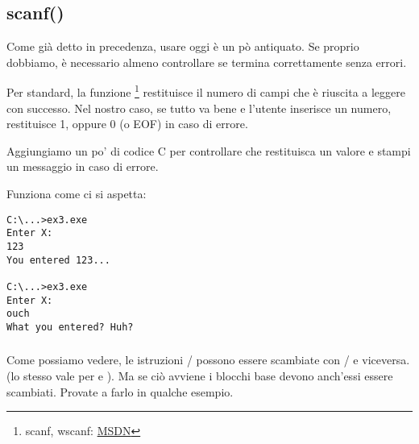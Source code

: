 \subsection{scanf()}

Come già detto in precedenza, usare \scanf oggi è un pò antiquato.
Se proprio dobbiamo, è necessario almeno controllare se \scanf termina correttamente senza errori.



Per standard, la funzione \scanf\footnote{scanf, wscanf: \href{http://msdn.microsoft.com/en-us/library/9y6s16x1(VS.71).aspx}{MSDN}} restituisce il numero di campi che è riuscita a leggere con successo.
Nel nostro caso, se tutto va bene e l'utente inserisce un numero, \scanf restituisce 1, oppure 0 (o \ac{EOF}) in caso di errore. 

Aggiungiamo un po' di codice C per controllare che \scanf restituisca un valore e stampi un messaggio in caso di errore.

Funziona come ci si aspetta:

\begin{lstlisting}
C:\...>ex3.exe
Enter X:
123
You entered 123...

C:\...>ex3.exe
Enter X:
ouch
What you entered? Huh?
\end{lstlisting}






\subsubsection{\Exercise}

Come possiamo vedere, le istruzioni / possono essere scambiate con / e viceversa.
(lo stesso vale per  e ).
Ma se ciò avviene i blocchi base devono anch'essi essere scambiati. Provate a farlo in qualche esempio.

